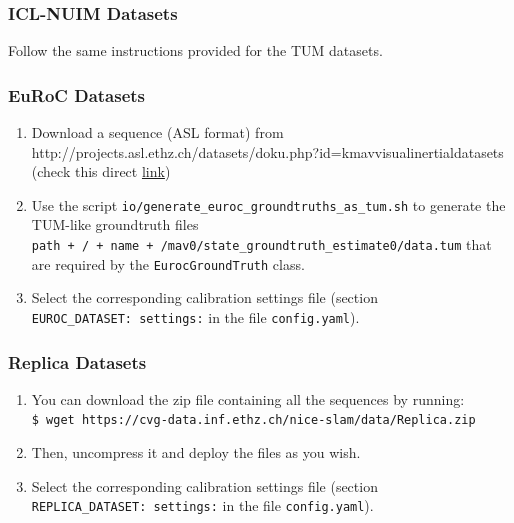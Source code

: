 \documentclass{article}
\providecommand{\tightlist}{%
  \setlength{\itemsep}{0pt}\setlength{\parskip}{0pt}}
\begin{document}
\hypertarget{icl-nuim-datasets}{%
\subsubsection{ICL-NUIM Datasets}\label{icl-nuim-datasets}}

Follow the same instructions provided for the TUM datasets.

\hypertarget{euroc-datasets}{%
\subsubsection{EuRoC Datasets}\label{euroc-datasets}}

\begin{enumerate}
\def\labelenumi{\arabic{enumi}.}
\tightlist
\item
  Download a sequence (ASL format) from
  http://projects.asl.ethz.ch/datasets/doku.php?id=kmavvisualinertialdatasets
  (check this direct
  \href{http://robotics.ethz.ch/~asl-datasets/ijrr_euroc_mav_dataset/}{link})
\item
  Use the script \texttt{io/generate\_euroc\_groundtruths\_as\_tum.sh}
  to generate the TUM-like groundtruth files
  \texttt{path\ +\ \textquotesingle{}/\textquotesingle{}\ +\ name\ +\ \textquotesingle{}/mav0/state\_groundtruth\_estimate0/data.tum\textquotesingle{}}
  that are required by the \texttt{EurocGroundTruth} class.
\item
  Select the corresponding calibration settings file (section
  \texttt{EUROC\_DATASET:\ settings:} in the file \texttt{config.yaml}).
\end{enumerate}

\hypertarget{replica-datasets}{%
\subsubsection{Replica Datasets}\label{replica-datasets}}

\begin{enumerate}
\def\labelenumi{\arabic{enumi}.}
\tightlist
\item
  You can download the zip file containing all the sequences by
  running:\\
  \texttt{\$\ wget\ https://cvg-data.inf.ethz.ch/nice-slam/data/Replica.zip}~\\
\item
  Then, uncompress it and deploy the files as you wish.
\item
  Select the corresponding calibration settings file (section
  \texttt{REPLICA\_DATASET:\ settings:} in the file
  \texttt{config.yaml}).
\end{enumerate}
\end{document}
